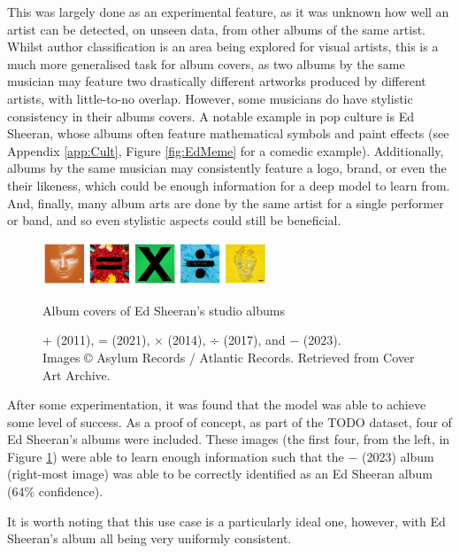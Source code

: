                 This was largely done as an experimental feature, as it was unknown how well an artist can be detected, on unseen data, from other albums of the same artist. Whilst author classification is an area being explored for visual artists, this is a much more generalised task for album covers, as two albums by the same musician may feature two drastically different artworks produced by different artists, with little-to-no overlap. However, some musicians do have stylistic consistency in their albums covers. A notable example in pop culture is Ed Sheeran, whose albums often feature mathematical symbols and paint effects (see Appendix \ref{app:Cult}, Figure \ref{fig:EdMeme} for a comedic example). Additionally, albums by the same musician may consistently feature a logo, brand, or even the their likeness, which could be enough information for a deep model to learn from. And, finally, many album arts are done by the same artist for a single performer or band, and so even stylistic aspects could still be beneficial.
    
                \begin{figure}[h]
                    \centering
                    \includegraphics[width=0.6\textwidth]{images/EdAlbums.png}
                    \caption{Album covers of Ed Sheeran’s studio albums}
                    \label{fig:EdAlbums}
                    \caption*{+ (2011), = (2021), × (2014), ÷ (2017), and − (2023). \\ Images © Asylum Records / Atlantic Records. Retrieved from Cover Art Archive.}
                \end{figure}
    
                After some experimentation, it was found that the model was able to achieve some level of success. As a proof of concept, as part of the TODO dataset, four of Ed Sheeran's albums were included. These images (the first four, from the left, in Figure \ref{fig:EdAlbums}) were able to learn enough information such that the − (2023) album (right-most image) was able to be correctly identified as an Ed Sheeran album (64\% confidence).
    
                It is worth noting that this use case is a particularly ideal one, however, with Ed Sheeran's album all being very uniformly consistent.
    
